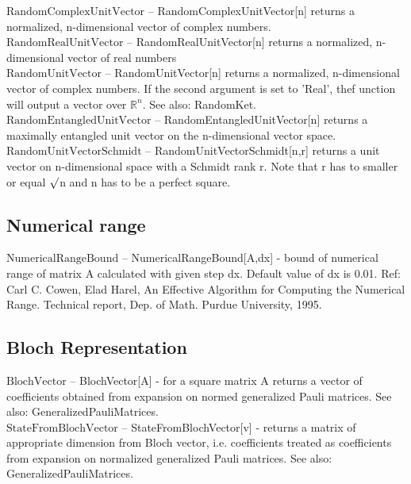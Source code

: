 \noindent\textbf{$ \text{RandomComplexUnitVector} $ }-- RandomComplexUnitVector[n] returns a normalized, n-dimensional vector of complex numbers.$  $\\
\noindent\textbf{$ \text{RandomRealUnitVector} $ }-- RandomRealUnitVector[n] returns a normalized, n-dimensional vector of real numbers$  $\\
\noindent\textbf{$ \text{RandomUnitVector} $ }-- RandomUnitVector[n] returns a normalized, n-dimensional vector of complex numbers. If the second argument is set to 'Real', thef unction will output a vector over $ \mathbb{R}^n $. See also: RandomKet.$  $\\
\noindent\textbf{$ \text{RandomEntangledUnitVector} $ }-- RandomEntangledUnitVector[n] returns a maximally entangled unit vector on the n-dimensional vector space.$  $\\
\noindent\textbf{$ \text{RandomUnitVectorSchmidt} $ }-- RandomUnitVectorSchmidt[n,r] returns a unit vector on n-dimensional space with a Schmidt rank r. Note that r has to smaller or equal $\surd $n and n has to be a perfect square.$  $\\
\subsection{Numerical range}

\noindent\textbf{$ \text{NumericalRangeBound} $ }-- NumericalRangeBound[A,dx] - bound of numerical range of matrix A calculated with given step dx. Default value of dx is 0.01. Ref: Carl C. Cowen, Elad Harel, An Effective Algorithm for Computing the Numerical Range. Technical report, Dep. of Math. Purdue University, 1995.$  $\\
\subsection{Bloch Representation}

\noindent\textbf{$ \text{BlochVector} $ }-- BlochVector[A] - for a square matrix A returns a vector of coefficients obtained from expansion on normed generalized Pauli matrices. See also: GeneralizedPauliMatrices.$  $\\
\noindent\textbf{$ \text{StateFromBlochVector} $ }-- StateFromBlochVector[v] - returns a matrix of appropriate dimension from Bloch vector, i.e. coefficients treated as coefficients from expansion on normalized generalized Pauli matrices. See also: GeneralizedPauliMatrices.$  $\\
